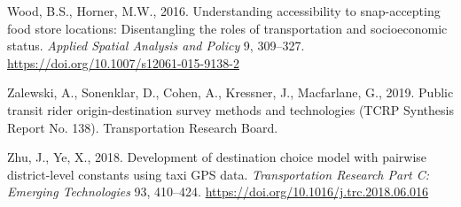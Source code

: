 \documentclass[3p, authoryear, review]{elsarticle} %
\newlength{\cslhangindent}
\newenvironment{CSLReferences}[2] %
 {%
  \setlength{\parindent}{0pt}
  \ifodd #1 \everypar{\setlength{\hangindent}{\cslhangindent}}\ignorespaces\fi
  \ifnum #2 > 0
  \setlength{\parskip}{#2\baselineskip}
  \fi
 }%
 {}
\begin{document}
\begin{CSLReferences}{1}{0}
\leavevmode{}%
Wood, B.S., Horner, M.W., 2016. Understanding accessibility to snap-accepting food store locations: Disentangling the roles of transportation and socioeconomic status. \emph{Applied Spatial Analysis and Policy} 9, 309--327. \url{https://doi.org/10.1007/s12061-015-9138-2}

\leavevmode{}%
Zalewski, A., Sonenklar, D., Cohen, A., Kressner, J., Macfarlane, G., 2019. Public transit rider origin-destination survey methods and technologies (TCRP Synthesis Report No. 138). Transportation Research Board.

\leavevmode{}%
Zhu, J., Ye, X., 2018. Development of destination choice model with pairwise district-level constants using taxi GPS data. \emph{Transportation Research Part C: Emerging Technologies} 93, 410--424. \url{https://doi.org/10.1016/j.trc.2018.06.016}

\end{CSLReferences}
\end{document}
